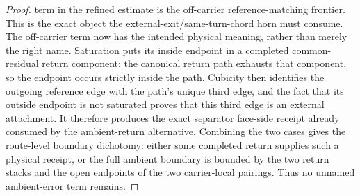 \begin{proof}
term in the refined estimate is the off-carrier reference-matching frontier.
This is the exact object the external-exit/same-turn-chord horn must consume.
The off-carrier term now has the intended physical meaning, rather than merely
the right name.  Saturation puts its inside endpoint in a completed
common-residual return component; the canonical return path exhausts that
component, so the endpoint occurs strictly inside the path.  Cubicity then
identifies the outgoing reference edge with the path's unique third edge, and
the fact that its outside endpoint is not saturated proves that this third edge
is an external attachment.  It therefore produces the exact separator
face-side receipt already consumed by the ambient-return alternative.
Combining the two cases gives the route-level boundary dichotomy: either some
completed return supplies such a physical receipt, or the full ambient
boundary is bounded by the two return stacks and the open endpoints of the two
carrier-local pairings.  Thus no unnamed ambient-error term remains.
\end{proof}

